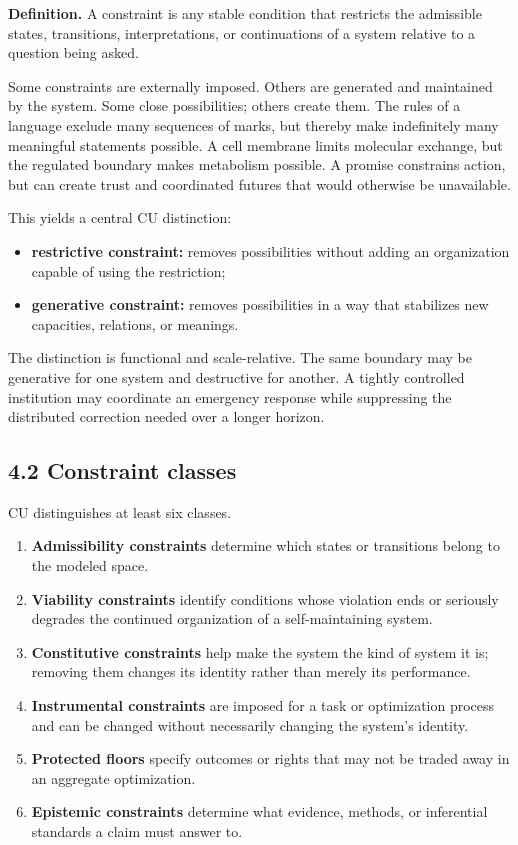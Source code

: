 \documentclass[
  11pt,
]{article}
\providecommand{\tightlist}{%
  \setlength{\itemsep}{0pt}\setlength{\parskip}{0pt}}
\begin{document}
\textbf{Definition.} A constraint is any stable condition that restricts
the admissible states, transitions, interpretations, or continuations of
a system relative to a question being asked.

Some constraints are externally imposed. Others are generated and
maintained by the system. Some close possibilities; others create them.
The rules of a language exclude many sequences of marks, but thereby
make indefinitely many meaningful statements possible. A cell membrane
limits molecular exchange, but the regulated boundary makes metabolism
possible. A promise constrains action, but can create trust and
coordinated futures that would otherwise be unavailable.

This yields a central CU distinction:

\begin{itemize}
\tightlist
\item
  \textbf{restrictive constraint:} removes possibilities without adding
  an organization capable of using the restriction;
\item
  \textbf{generative constraint:} removes possibilities in a way that
  stabilizes new capacities, relations, or meanings.
\end{itemize}

The distinction is functional and scale-relative. The same boundary may
be generative for one system and destructive for another. A tightly
controlled institution may coordinate an emergency response while
suppressing the distributed correction needed over a longer horizon.

\subsection{4.2 Constraint classes}\label{constraint-classes}

CU distinguishes at least six classes.

\begin{enumerate}
\def\labelenumi{\arabic{enumi}.}
\tightlist
\item
  \textbf{Admissibility constraints} determine which states or
  transitions belong to the modeled space.
\item
  \textbf{Viability constraints} identify conditions whose violation
  ends or seriously degrades the continued organization of a
  self-maintaining system.
\item
  \textbf{Constitutive constraints} help make the system the kind of
  system it is; removing them changes its identity rather than merely
  its performance.
\item
  \textbf{Instrumental constraints} are imposed for a task or
  optimization process and can be changed without necessarily changing
  the system's identity.
\item
  \textbf{Protected floors} specify outcomes or rights that may not be
  traded away in an aggregate optimization.
\item
  \textbf{Epistemic constraints} determine what evidence, methods, or
  inferential standards a claim must answer to.
\end{enumerate}
\end{document}
